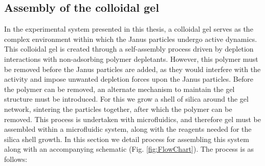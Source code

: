 \subsection{Assembly of the colloidal gel}
\label{sec:AssemblyOfTheColloidalGel}


In the experimental system presented in this thesis, a colloidal gel serves as the complex environment within which the Janus particles undergo active dynamics. This colloidal gel is created through a self-assembly process driven by depletion interactions with non-adsorbing polymer depletants. However, this polymer must be removed before the Janus particles are added, as they would interfere with the activity and impose unwanted depletion forces upon the Janus particles. Before the polymer can be removed, an alternate mechanism to maintain the gel structure must be introduced. For this we grow a shell of silica around the gel network, sintering the particles together, after which the polymer can be removed. This process is undertaken with microfluidics, and therefore gel must be assembled within a microfluidic system, along with the reagents needed for the silica shell growth. In this section we detail process for assembling this system along with an accompanying schematic (Fig. \ref{fig:FlowChart}). The process is as follows:

